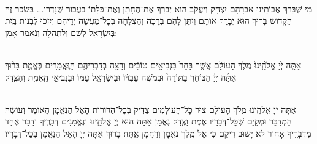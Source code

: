 \torahbarachu

\hagomel




\begin{sometimes}

\misheberakhbaby

\misheberakhbarmitzva

\\
מִי שֶׁבֵּרַךְ אֲבוֹתֵֽינוּ אַבְרָהָם יִצְחָק וְיַעֲקֹב הוּא יְבָרֵךְ אֶת־הֶחָתָן  וְאֶת־כַּלָתוֹ  בַּעֲבוּר שֶׁנָדְרוּ... בִּשְׂכַר זֶה הַקָדוֹשׁ בָּרוּךְ הוּא יְבָרֵךְ אוֹתָם וְיִתֵּן לָהֶם בְּרָכָה וְהַצְלָחָה בְּכׇל־מַעֲשֵׂה יְדֵיהֶם וְיִזְכוּ לִבְנוֹת בַּֽיִת בְּיִשְׂרָאֵל לְשֵׁם וְלִתְהִלָה וְנֹאמַר אָמֵן:


\end{sometimes}

\halfkaddish

\hagbaha
\newpage
{}

\\
אַתָּ֤ה יְ֙יָ אֱלֹ֙הֵֽינוּ֙ מֶ֣לֶךְ הָעוֹלָ֔ם אֲשֶׁ֤ר בָּחַר֙ בִּנְבִיאִ֣ים טוֹבִ֔ים וְרָצָ֥ה בְדִבְרֵיהֶ֖ם הַנֶּֽאֱמָרִ֣ים בֶּאֱמֶ֑ת בָּר֨וּךְ אַתָּ֜ה יְיָ֗ הַבּוֹחֵר֚ בַּתּוֹרָה֙ וּבְמֹשֶׁ֣ה עַבְדּ֔וֹ וּבְיִשְׂרָאֵ֣ל עַמּ֔וֹ וּבִנְבִיאֵ֥י הָֽאֱמֶ֖ת וְהַצֶֽדֶק׃

\\
אַתָּה יְיָ אֱלֹהֵֽינוּ מֶֽלֶךְ הָעוֹלָם צוּר כׇּל־הָעוֹלָמִים צַדִּיק בְּכׇל־הַדּוֹרוֹת הָאֵל הַנֶּאֱמָן הָאוֹמֵר וְעוֹשֶׂה הַמְדַבֵּר וּמְקַיֵּם שֶׁכׇּל־דְּבָרָיו אֱמֶת וָצֶֽדֶק׃ נֶאֱמָן אַתָּה הוּא יְיָ אֱלֹהֵֽינוּ וְנֶאֱמָנִים דְּבָרֶֽיךָ וְדָבָר אֶחָד מִדְּבָרֶֽיךָ אָחוֹר לֹא יָשׁוּב רֵיקָם כִּי אֵל מֶֽלֶךְ נֶאֱמָן וְרַחֲמָן אַֽתָּה׃ בָּרוּךְ אַתָּה יְיָ הָאֵל הַנֶּאֱמָן בְּכׇל־דְּבָרָיו׃

